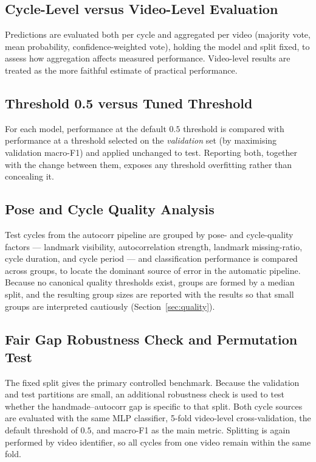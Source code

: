 \subsection{Cycle-Level versus Video-Level Evaluation}
\label{sec:abl-cycle-video}
Predictions are evaluated both per cycle and aggregated per video (majority
vote, mean probability, confidence-weighted vote), holding the model and split
fixed, to assess how aggregation affects measured performance. Video-level
results are treated as the more faithful estimate of practical performance.

\subsection{Threshold 0.5 versus Tuned Threshold}
\label{sec:abl-threshold}
For each model, performance at the default $0.5$ threshold is compared with
performance at a threshold selected on the \emph{validation} set (by maximising
validation macro-F1) and applied unchanged to test. Reporting both, together
with the change between them, exposes any threshold overfitting rather than
concealing it.

\subsection{Pose and Cycle Quality Analysis}
\label{sec:abl-quality}
Test cycles from the autocorr pipeline are grouped by pose- and cycle-quality
factors --- landmark visibility, autocorrelation strength, landmark
missing-ratio, cycle duration, and cycle period --- and classification
performance is compared across groups, to locate the dominant source of error in
the automatic pipeline. Because no canonical quality thresholds exist, groups are
formed by a median split, and the resulting group sizes are reported with the
results so that small groups are interpreted cautiously
(Section~\ref{sec:quality}).

\subsection{Fair Gap Robustness Check and Permutation Test}
\label{sec:abl-fair-gap}

The fixed split gives the primary controlled benchmark. Because the validation
and test partitions are small, an additional robustness check is used to test
whether the handmade--autocorr gap is specific to that split. Both cycle sources
are evaluated with the same MLP classifier, 5-fold video-level cross-validation,
the default threshold of $0.5$, and macro-F1 as the main metric. Splitting is
again performed by video identifier, so all cycles from one video remain within
the same fold.

